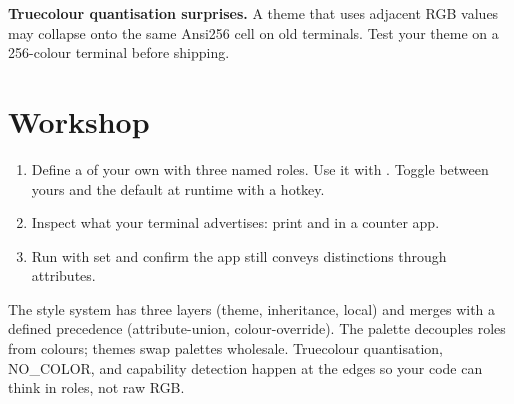 \begin{warning}
\textbf{Truecolour quantisation surprises.} A theme that uses
adjacent RGB values may collapse onto the same Ansi256 cell on
old terminals. Test your theme on a 256-colour terminal before
shipping.
\end{warning}

\section*{Workshop}

\begin{enumerate}[leftmargin=*]
  \item Define a  of your own with three named roles.
    Use it with . Toggle between yours
    and the default at runtime with a hotkey.
  \item Inspect what your terminal advertises: print
     and  in a
    counter app.
  \item Run with  set and confirm the app
    still conveys distinctions through attributes.
\end{enumerate}

\begin{recap}
The style system has three layers (theme, inheritance, local) and
merges with a defined precedence (attribute-union,
colour-override). The palette decouples roles from colours;
themes swap palettes wholesale. Truecolour quantisation,
NO\_COLOR, and capability detection happen at the edges so your
code can think in roles, not raw RGB.
\end{recap}
